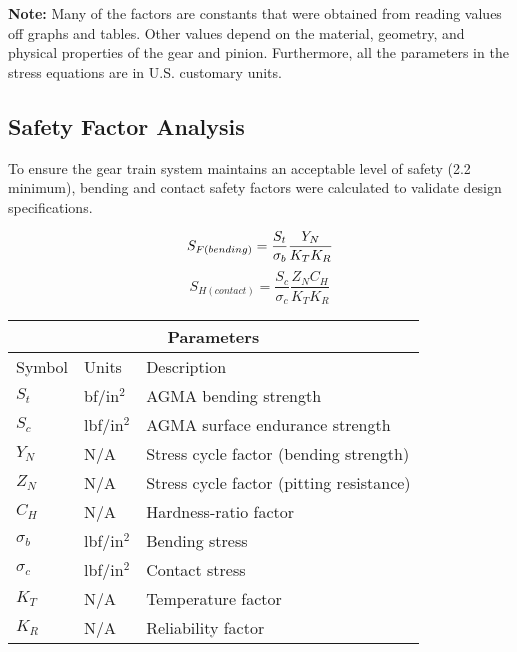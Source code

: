 \documentclass[letterpaper,12pt]{article}
\begin{document}
\noindent\textbf{Note:} Many of the factors are constants that were obtained from reading values off graphs and tables. Other values depend on the material, geometry, and physical properties of the gear and pinion. Furthermore, all the parameters in the stress equations are in U.S. customary units.

\subsection{Safety Factor Analysis}
To ensure the gear train system maintains an acceptable level of safety (2.2 minimum), bending and contact safety factors were calculated to validate design specifications.

    \begin{equation}
        S_{F(bending)} = \frac{S_t}{\sigma_b}\frac{Y_N}{K_T K_R} \\
    \end{equation}
    \begin{equation}
        S_{H(contact)} = \frac{S_c}{\sigma_c}\frac{Z_N C_H}{K_T K_R}
    \end{equation}
    
    \begin{center}
	    \begin{tabular}{ |p{2cm}||p{2cm}|p{7cm}|  }
			\hline
			\multicolumn{3}{|c|}{Parameters} \\
			\hline
			Symbol & Units & Description\\
			\hline
			$S_t$ & bf/in$^2$ & AGMA bending strength\\
			$S_c$ & lbf/in$^2$ & AGMA surface endurance strength\\
			$Y_N$ & N/A & Stress cycle factor (bending strength)\\
			$Z_N$ & N/A & Stress cycle factor (pitting resistance)\\
			$C_H$ & N/A & Hardness-ratio factor\\
			$\sigma_b$ & lbf/in$^2$ & Bending stress\\
			$\sigma_c$ & lbf/in$^2$ & Contact stress\\
			$K_T$ & N/A & Temperature factor\\
			$K_R$ & N/A & Reliability factor\\
			\hline
		\end{tabular}
	\end{center}
\end{document}
